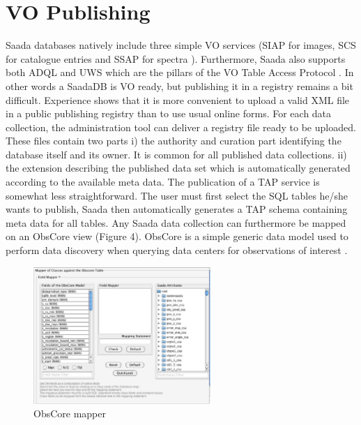 \section{VO Publishing}
Saada databases natively include three simple VO services (SIAP for images, SCS for catalogue entries and SSAP for spectra \citep{SIAP,SCS,SSAP} ). Furthermore, Saada also supports both ADQL \citep{ADQL} and UWS \citep{UWS} which are the pillars of the VO Table Access Protocol \citep{TAP}. In other words a SaadaDB is VO ready, but publishing it in a registry \citep{REG} remains a bit difficult. Experience shows that it is more convenient to upload a valid XML file in a public publishing registry than to use usual online forms. For each data collection, the administration tool can deliver a registry file ready to be uploaded. These files contain two parts i) the authority and curation part identifying the database itself and its owner. It is common for all published data collections. ii) the extension describing the published data set which is automatically generated according to the available meta data. The publication of a TAP service is somewhat less straightforward. The user must first select the SQL tables he/she wants to publish, Saada then automatically generates a TAP schema containing meta data for all tables. Any Saada data collection can furthermore be mapped on an ObsCore view (Figure 4). ObsCore  is a simple generic data model used to perform data discovery when querying data centers for observations of interest \citep{OBSCORE}.

\begin{figure}[!h]
	\begin{center}
		\includegraphics[width=0.60\textwidth]{part8/MICHEL_P18/P18_fig4.eps}
	\end{center}
	\caption{ObsCore mapper}
	\label{fig:fig4}
\end{figure}

